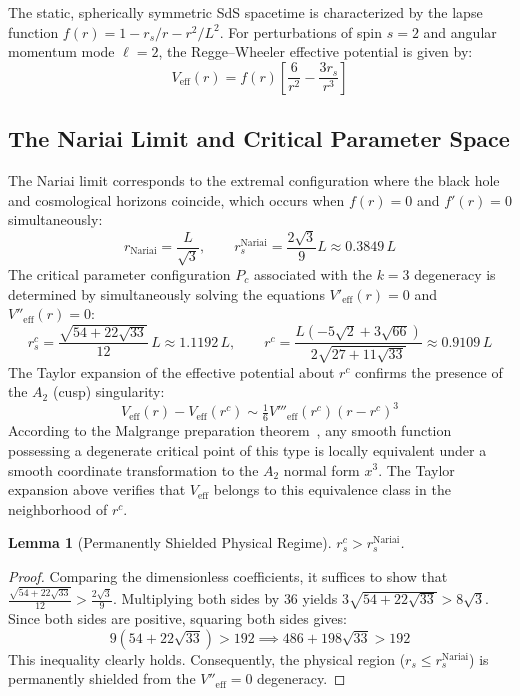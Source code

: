 \documentclass[12pt,a4paper]{amsart}
\newtheorem{lemma}[theorem]{Lemma}
\theoremstyle{remark}
\begin{document}
The static, spherically symmetric SdS spacetime is characterized by the lapse function
$f(r) = 1 - r_s/r - r^2/L^2$. For perturbations of spin $s=2$ and angular momentum mode $\ell=2$, the Regge--Wheeler effective potential is given by:
\[
  V_{\mathrm{eff}}(r) = f(r)\left[\frac{6}{r^2} - \frac{3r_s}{r^3}\right]
\]

\subsection{The Nariai Limit and Critical Parameter Space}

The Nariai limit corresponds to the extremal configuration where the black hole and cosmological horizons coincide, which occurs when $f(r) = 0$ and $f'(r) = 0$ simultaneously:
\[
  r_{\mathrm{Nariai}} = \frac{L}{\sqrt{3}},
  \qquad
  r_s^{\mathrm{Nariai}} = \frac{2\sqrt{3}}{9}L \approx 0.3849\,L
\]
The critical parameter configuration $P_c$ associated with the $k=3$ degeneracy is determined by
simultaneously solving the equations $V'_{\mathrm{eff}}(r)=0$ and $V''_{\mathrm{eff}}(r)=0$:
\[
  r_s^c = \frac{\sqrt{54+22\sqrt{33}}}{12}\,L \approx 1.1192\,L,
  \qquad
  r^c = \frac{L(-5\sqrt{2}+3\sqrt{66})}{2\sqrt{27+11\sqrt{33}}} \approx 0.9109\,L
\]
The Taylor expansion of the effective potential about $r^c$ confirms the presence of the $A_2$ (cusp) singularity:
\[
  V_{\mathrm{eff}}(r) - V_{\mathrm{eff}}(r^c)
  \sim \tfrac{1}{6}V'''_{\mathrm{eff}}(r^c)(r - r^c)^3
\]
According to the Malgrange preparation theorem~\cite{Malgrange64}, any smooth function
possessing a degenerate critical point of this type is locally equivalent under a smooth
coordinate transformation to the $A_2$ normal form $x^3$. The Taylor expansion above
verifies that $V_{\mathrm{eff}}$ belongs to this equivalence class in the neighborhood of $r^c$.

\begin{lemma}[Permanently Shielded Physical Regime]
\label{lem:physical_shielding}
$r_s^c > r_s^{\mathrm{Nariai}}$.
\end{lemma}

\begin{proof}
Comparing the dimensionless coefficients, it suffices to show that $\frac{\sqrt{54+22\sqrt{33}}}{12} > \frac{2\sqrt{3}}{9}$.
Multiplying both sides by $36$ yields $3\sqrt{54+22\sqrt{33}} > 8\sqrt{3}$. Since both sides are
positive, squaring both sides gives:
\[
  9(54 + 22\sqrt{33}) > 192 \implies 486 + 198\sqrt{33} > 192
\]
This inequality clearly holds. Consequently, the physical region ($r_s \leq r_s^{\mathrm{Nariai}}$) is
permanently shielded from the $V''_{\mathrm{eff}}=0$ degeneracy.
\end{proof}
\end{document}
